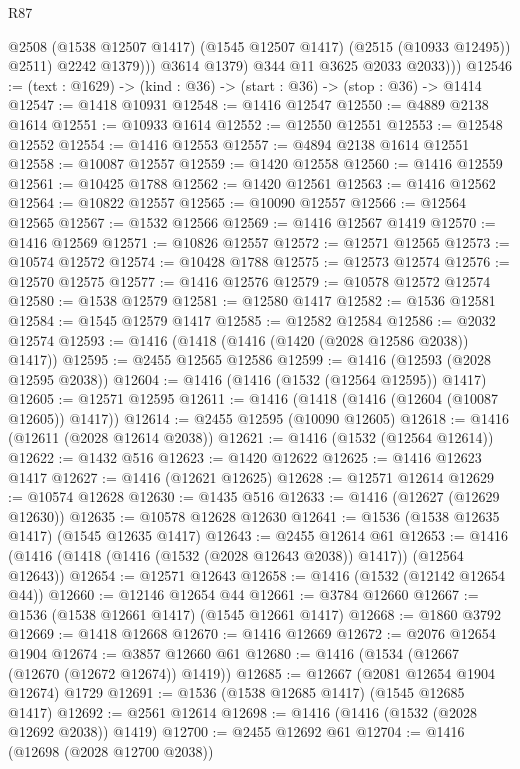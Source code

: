 \begin{lexlean}{R87}
\begin{coremodule}
{{                  @2508 (@1538 @12507 @1417) (@1545 @12507 @1417) (@2515 (@10933 @12495)) @2511)
                  @2242
                  @1379)))
            @3614
            @1379)
          @344
          @11
          @3625
          @2033
          @2033)))
@12546 := (text : @1629) -> (kind : @36) -> (start : @36) -> (stop : @36) -> @1414
@12547 := @1418 @10931
@12548 := @1416 @12547
@12550 := @4889 @2138 @1614
@12551 := @10933 @1614
@12552 := @12550 @12551
@12553 := @12548 @12552
@12554 := @1416 @12553
@12557 := @4894 @2138 @1614 @12551
@12558 := @10087 @12557
@12559 := @1420 @12558
@12560 := @1416 @12559
@12561 := @10425 @1788
@12562 := @1420 @12561
@12563 := @1416 @12562
@12564 := @10822 @12557
@12565 := @10090 @12557
@12566 := @12564 @12565
@12567 := @1532 @12566
@12569 := @1416 @12567 @1419
@12570 := @1416 @12569
@12571 := @10826 @12557
@12572 := @12571 @12565
@12573 := @10574 @12572
@12574 := @10428 @1788
@12575 := @12573 @12574
@12576 := @12570 @12575
@12577 := @1416 @12576
@12579 := @10578 @12572 @12574
@12580 := @1538 @12579
@12581 := @12580 @1417
@12582 := @1536 @12581
@12584 := @1545 @12579 @1417
@12585 := @12582 @12584
@12586 := @2032 @12574
@12593 := @1416 (@1418 (@1416 (@1420 (@2028 @12586 @2038)) @1417))
@12595 := @2455 @12565 @12586
@12599 := @1416 (@12593 (@2028 @12595 @2038))
@12604 := @1416 (@1416 (@1532 (@12564 @12595)) @1417)
@12605 := @12571 @12595
@12611 := @1416 (@1418 (@1416 (@12604 (@10087 @12605)) @1417))
@12614 := @2455 @12595 (@10090 @12605)
@12618 := @1416 (@12611 (@2028 @12614 @2038))
@12621 := @1416 (@1532 (@12564 @12614))
@12622 := @1432 @516
@12623 := @1420 @12622
@12625 := @1416 @12623 @1417
@12627 := @1416 (@12621 @12625)
@12628 := @12571 @12614
@12629 := @10574 @12628
@12630 := @1435 @516
@12633 := @1416 (@12627 (@12629 @12630))
@12635 := @10578 @12628 @12630
@12641 := @1536 (@1538 @12635 @1417) (@1545 @12635 @1417)
@12643 := @2455 @12614 @61
@12653 := @1416 (@1416 (@1418 (@1416 (@1532 (@2028 @12643 @2038)) @1417)) (@12564 @12643))
@12654 := @12571 @12643
@12658 := @1416 (@1532 (@12142 @12654 @44))
@12660 := @12146 @12654 @44
@12661 := @3784 @12660
@12667 := @1536 (@1538 @12661 @1417) (@1545 @12661 @1417)
@12668 := @1860 @3792
@12669 := @1418 @12668
@12670 := @1416 @12669
@12672 := @2076 @12654 @1904
@12674 := @3857 @12660 @61
@12680 := @1416 (@1534 (@12667 (@12670 (@12672 @12674)) @1419))
@12685 := @12667 (@2081 @12654 @1904 @12674) @1729
@12691 := @1536 (@1538 @12685 @1417) (@1545 @12685 @1417)
@12692 := @2561 @12614
@12698 := @1416 (@1416 (@1532 (@2028 @12692 @2038)) @1419)
@12700 := @2455 @12692 @61
@12704 := @1416 (@12698 (@2028 @12700 @2038))
}}
\end{coremodule}
\end{lexlean}
